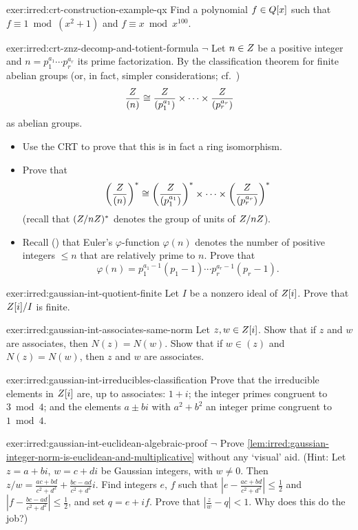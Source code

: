 \begin{exer}{}{exer:irred:crt-construction-example-qx}
  \exerused{}Find a polynomial $f \in Q[x]$ such that
  $f \equiv 1 \bmod (x^2 + 1)$ and $f \equiv x \bmod x^{100}$.
\end{exer}
\begin{exer}{}{exer:irred:crt-znz-decomp-and-totient-formula}
  $\lnot$ Let $n \in Z$ be a positive integer and
  $n = p_1^{a_1} \cdots p_r^{a_r}$ its prime factorization. By the
  classification theorem for finite abelian groups (or, in fact,
  simpler considerations; cf.\ )
  \[\frac{Z}{(n)} \cong \frac{Z}{(p_1^{a_1})} \times
    \dots \times \frac{Z}{(p_r^{a_r})}\] as abelian groups.
  \begin{itemize}
  \item Use the CRT to prove that this is in fact a ring isomorphism.
  \item Prove that
    \[\left(\frac{Z}{(n)}\right)^* \cong
      \left(\frac{Z}{(p_1^{a_1})}\right)^* \times \cdots \times
      \left(\frac{Z}{(p_r^{a_r})}\right)^*\] (recall that
    $(Z/nZ)^*$ denotes the group of units of $Z/nZ$).
  \item Recall () that
    Euler's $\varphi$-function $\varphi(n)$ denotes the number of
    positive integers $\leq n$ that are relatively prime to $n$. Prove
    that
    \[\varphi(n) = p_1^{a_1 - 1}(p_1 - 1) \cdots p_r^{a_r - 1}(p_r -
      1).\]
  \end{itemize}
\end{exer}
\begin{exer}{}{exer:irred:gaussian-int-quotient-finite}
  Let $I$ be a nonzero ideal of $Z[i]$. Prove that $Z[i]/I$ is
  finite.
\end{exer}
\begin{exer}{}{exer:irred:gaussian-int-associates-same-norm}
  \exerused{}Let $z, w \in Z[i]$. Show that if $z$ and $w$ are
  associates, then $N(z) = N(w)$. Show that if $w \in (z)$ and
  $N(z) = N(w)$, then $z$ and $w$ are associates.
\end{exer}
\begin{exer}{}{exer:irred:gaussian-int-irreducibles-classification}
  Prove that the irreducible elements in $Z[i]$ are, up to
  associates: $1 + i$; the integer primes congruent to $3 \bmod 4$;
  and the elements $a \pm bi$ with $a^2 + b^2$ an integer prime
  congruent to $1 \bmod 4$.
\end{exer}
\begin{exer}{}{exer:irred:gaussian-int-euclidean-algebraic-proof}
  $\lnot$ Prove \cref{lem:irred:gaussian-integer-norm-is-euclidean-and-multiplicative} without any `visual' aid. (Hint:
  Let $z = a + bi$, $w = c + di$ be Gaussian integers, with
  $w \neq 0$. Then
  $z/w = \frac{ac+bd}{c^2+d^2} + \frac{bc-ad}{c^2+d^2} i$. Find
  integers $e$, $f$ such that
  $|e - \frac{ac+bd}{c^2+d^2}| \leq \frac{1}{2}$ and
  $|f - \frac{bc-ad}{c^2+d^2}| \leq \frac{1}{2}$, and set
  $q = e + if$. Prove that $|\frac{z}{w} - q| < 1$. Why does this do
  the job?)
\end{exer}
